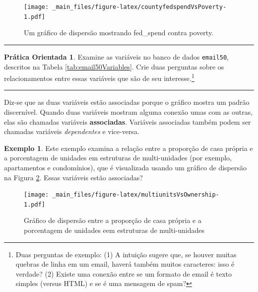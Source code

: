 \documentclass[
]{book}
\theoremstyle{definition}
\theoremstyle{definition}
\newtheorem{example}{Exemplo}[chapter]
\theoremstyle{definition}
\newtheorem{exercise}{Prática Orientada}[chapter]
\theoremstyle{definition}
\theoremstyle{remark}
\begin{document}
\begin{figure}
\centering
\texttt{[image: \_main\_files/figure-latex/countyfedspendVsPoverty-1.pdf]}
\caption{\label{fig:countyfedspendVsPoverty}Um gráfico de dispersão mostrando fed\_spend contra poverty.}
\end{figure}

\begin{center}\rule{0.5\linewidth}{0.5pt}\end{center}

\begin{exercise}
\protect\hypertarget{exr:unnamed-chunk-6}{}{\label{exr:unnamed-chunk-6} }Examine as variáveis no banco de dados \texttt{email50}, descritos na Tabela \ref{tab:email50Variables}. Crie duas perguntas sobre os relacionamentos entre essas variáveis que são de seu interesse.\footnote{Duas perguntas de exemplo: (1) A intuição sugere que, se houver muitas quebras de linha em um email, haverá também muitos caracteres: isso é verdade? (2) Existe uma conexão entre se um formato de email é texto simples (versus HTML) e se é uma mensagem de spam?}
\end{exercise}

\begin{center}\rule{0.5\linewidth}{0.5pt}\end{center}

Diz-se que as duas variáveis estão associadas porque o gráfico mostra um padrão discernível. Quando duas variáveis mostram alguma conexão umas com as outras, elas são chamadas variáveis \textbf{associadas}. Variáveis associadas também podem ser chamadas variáveis \emph{dependentes} e vice-versa.

\begin{example}
\protect\hypertarget{exm:unnamed-chunk-7}{}{\label{exm:unnamed-chunk-7} }Este exemplo examina a relação entre a proporção de casa própria e a porcentagem de unidades em estruturas de multi-unidades (por exemplo, apartamentos e condomínios), que é visualizada usando um gráfico de dispersão na Figura \ref{fig:multiunitsVsOwnership}. Essas variáveis estão associadas?
\end{example}

\begin{figure}
\centering
\texttt{[image: \_main\_files/figure-latex/multiunitsVsOwnership-1.pdf]}
\caption{\label{fig:multiunitsVsOwnership}Gráfico de dispersão entre a proporção de casa própria e a porcentagem de unidades eem estruturas de multi-unidades}
\end{figure}
\end{document}
